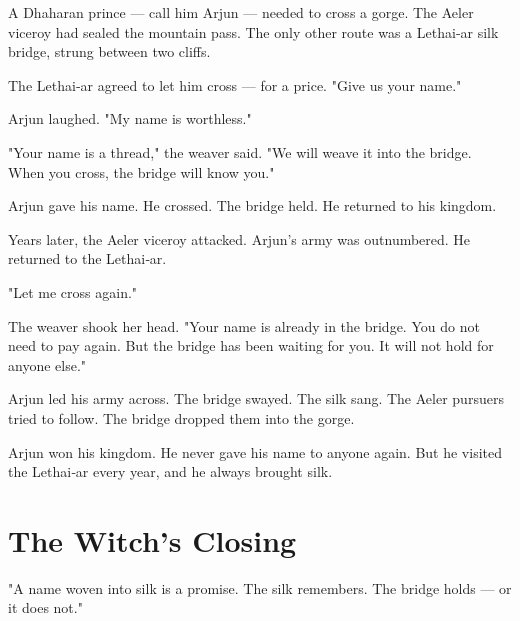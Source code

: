 \documentclass[10pt,twoside]{book}
\begin{document}
A Dhaharan prince --- call him Arjun --- needed to cross a gorge. The Aeler viceroy had sealed the mountain pass. The only other route was a Lethai‑ar silk bridge, strung between two cliffs.

The Lethai‑ar agreed to let him cross --- for a price. "Give us your name."

Arjun laughed. "My name is worthless."

"Your name is a thread," the weaver said. "We will weave it into the bridge. When you cross, the bridge will know you."

Arjun gave his name. He crossed. The bridge held. He returned to his kingdom.

Years later, the Aeler viceroy attacked. Arjun's army was outnumbered. He returned to the Lethai‑ar.

"Let me cross again."

The weaver shook her head. "Your name is already in the bridge. You do not need to pay again. But the bridge has been waiting for you. It will not hold for anyone else."

Arjun led his army across. The bridge swayed. The silk sang. The Aeler pursuers tried to follow. The bridge dropped them into the gorge.

Arjun won his kingdom. He never gave his name to anyone again. But he visited the Lethai‑ar every year, and he always brought silk.

\section*{The Witch's Closing}
"A name woven into silk is a promise. The silk remembers. The bridge holds --- or it does not."
\end{document}
